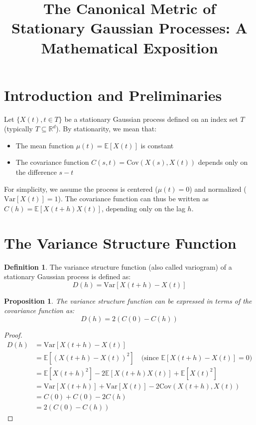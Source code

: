 \documentclass{article}
\title{The Canonical Metric of Stationary Gaussian Processes: A Mathematical Exposition}
\author{}
\date{}
\theoremstyle{plain}
\newtheorem{proposition}{Proposition}
\theoremstyle{definition}
\newtheorem{definition}{Definition}
\begin{document}
\maketitle

\section{Introduction and Preliminaries}

Let $\{X(t), t \in T\}$ be a stationary Gaussian process defined on an index set $T$ (typically $T \subseteq \mathbb{R}^d$). By stationarity, we mean that:
\begin{itemize}
    \item The mean function $\mu(t) = \mathbb{E}[X(t)]$ is constant
    \item The covariance function $C(s,t) = \text{Cov}(X(s),X(t))$ depends only on the difference $s-t$
\end{itemize}

For simplicity, we assume the process is centered ($\mu(t) = 0$) and normalized ($\text{Var}[X(t)] = 1$). The covariance function can thus be written as $C(h) = \mathbb{E}[X(t+h)X(t)]$, depending only on the lag $h$.

\section{The Variance Structure Function}

\begin{definition}
The variance structure function (also called variogram) of a stationary Gaussian process is defined as:
\begin{equation}
D(h) = \text{Var}[X(t+h) - X(t)]
\end{equation}
\end{definition}

\begin{proposition}
The variance structure function can be expressed in terms of the covariance function as:
\begin{equation}
D(h) = 2(C(0) - C(h))
\end{equation}
\end{proposition}

\begin{proof}
\begin{align}
D(h) &= \text{Var}[X(t+h) - X(t)] \\
&= \mathbb{E}[(X(t+h) - X(t))^2] \quad \text{(since $\mathbb{E}[X(t+h) - X(t)] = 0$)} \\
&= \mathbb{E}[X(t+h)^2] - 2\mathbb{E}[X(t+h)X(t)] + \mathbb{E}[X(t)^2] \\
&= \text{Var}[X(t+h)] + \text{Var}[X(t)] - 2\text{Cov}(X(t+h), X(t)) \\
&= C(0) + C(0) - 2C(h) \\
&= 2(C(0) - C(h))
\end{align}
\end{proof}
\end{document}
